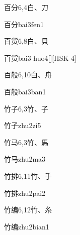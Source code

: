 \begin{entry}{百分}{6,4}{⽩、⼑}
  \begin{phonetics}{百分}{bai3fen1}
  \end{phonetics}
\end{entry}

\begin{entry}{百货}{6,8}{⽩、⾙}
  \begin{phonetics}{百货}{bai3 huo4}[][HSK 4]
  \end{phonetics}
\end{entry}

\begin{entry}{百般}{6,10}{⽩、⾈}
  \begin{phonetics}{百般}{bai3ban1}
  \end{phonetics}
\end{entry}

\begin{entry}{竹子}{6,3}{⽵、⼦}
  \begin{phonetics}{竹子}{zhu2zi5}
  \end{phonetics}
\end{entry}

\begin{entry}{竹马}{6,3}{⽵、⾺}
  \begin{phonetics}{竹马}{zhu2ma3}
  \end{phonetics}
\end{entry}

\begin{entry}{竹排}{6,11}{⽵、⼿}
  \begin{phonetics}{竹排}{zhu2pai2}
  \end{phonetics}
\end{entry}

\begin{entry}{竹编}{6,12}{⽵、⽷}
  \begin{phonetics}{竹编}{zhu2bian1}
  \end{phonetics}
\end{entry}

